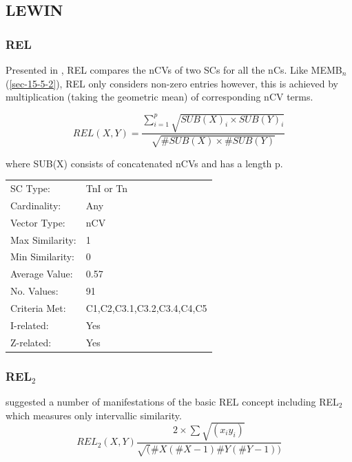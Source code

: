 \documentclass{article}
\begin{document}
\subsection{LEWIN}
\label{sec-15-7}
\subsubsection{REL}
\label{sec-15-7-1}

Presented in \citet{Lewin1979}, REL compares the nCVs of two SCs for
all the nCs. Like MEMB$_{n}$ (\ref{sec-15-5-2}), REL only considers non-zero
entries however, this is achieved by multiplication (taking the
geometric mean) of corresponding nCV terms.

$$REL(X,Y)=\frac{\sum_{i=1}^{p}{\sqrt{SUB(X)_{i}\times SUB(Y)_{i}}}}{\sqrt{\#SUB(X)\times \#SUB(Y)}}$$

where SUB(X) consists of concatenated nCVs and has a length p.

\begin{center}
\begin{tabular}{ll}
 SC Type:         &  TnI or Tn                   \\
 Cardinality:     &  Any                         \\
 Vector Type:     &  nCV                         \\
 Max Similarity:  &  1                           \\
 Min Similarity:  &  0                           \\
 Average Value:   &  0.57                        \\
 No. Values:      &  91                          \\
 Criteria Met:    &  C1,C2,C3.1,C3.2,C3.4,C4,C5  \\
 I-related:       &  Yes                         \\
 Z-related:       &  Yes                         \\
\end{tabular}
\end{center}
\subsubsection{REL$_{2}$}
\label{sec-15-7-2}

\citet{Rahn1979} suggested a number of manifestations of the basic REL
concept including REL$_{2}$ which measures only intervallic similarity.
$$ REL_{2}(X,Y)\frac{2\times\sum\sqrt{(x_{i}y_{i})}}{\sqrt(\#X(\#X-1)\#Y(\#Y-1))} $$
\end{document}
